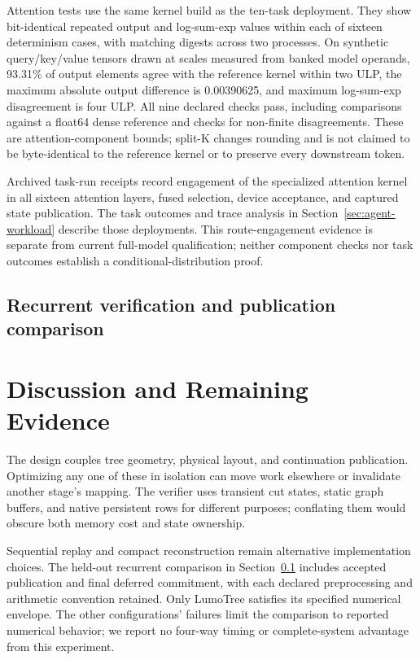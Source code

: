 \documentclass[conference]{IEEEtran}
\newcommand{\sys}{LumoTree}
\begin{document}
Attention tests use the same kernel build as the ten-task deployment. They show bit-identical repeated output and log-sum-exp values within each of sixteen determinism cases, with matching digests across two processes. On synthetic query/key/value tensors drawn at scales measured from banked model operands, 93.31\% of output elements agree with the reference kernel within two ULP, the maximum absolute output difference is 0.00390625, and maximum log-sum-exp disagreement is four ULP. All nine declared checks pass, including comparisons against a float64 dense reference and checks for non-finite disagreements. These are attention-component bounds; split-K changes rounding and is not claimed to be byte-identical to the reference kernel or to preserve every downstream token.

Archived task-run receipts record engagement of the specialized attention kernel in all sixteen attention layers, fused selection, device acceptance, and captured state publication. The task outcomes and trace analysis in Section~\ref{sec:agent-workload} describe those deployments. This route-engagement evidence is separate from current full-model qualification; neither component checks nor task outcomes establish a conditional-distribution proof.

\subsection{Recurrent verification and publication comparison}
\label{sec:m1-qualification}


\section{Discussion and Remaining Evidence}
\label{sec:planned}
The design couples tree geometry, physical layout, and continuation publication. Optimizing any one of these in isolation can move work elsewhere or invalidate another stage's mapping. The verifier uses transient cut states, static graph buffers, and native persistent rows for different purposes; conflating them would obscure both memory cost and state ownership.

Sequential replay and compact reconstruction remain alternative implementation choices. The held-out recurrent comparison in Section~\ref{sec:m1-qualification} includes accepted publication and final deferred commitment, with each declared preprocessing and arithmetic convention retained. Only \sys{} satisfies its specified numerical envelope. The other configurations' failures limit the comparison to reported numerical behavior; we report no four-way timing or complete-system advantage from this experiment.
\end{document}
